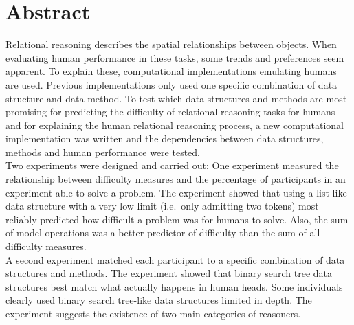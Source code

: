 \documentclass[hidelinks]{scrartcl}
\begin{document}


\section*{Abstract}
Relational reasoning describes the spatial relationships between objects. When evaluating human performance in these tasks, some trends and preferences seem apparent. To explain these, computational implementations emulating humans are used. Previous implementations only used one specific combination of data structure and data method. To test which data structures and methods are most promising for predicting the difficulty of relational reasoning tasks for humans and for explaining the human relational reasoning process, a new computational implementation was written and the dependencies between data structures, methods and human performance were tested. \\
Two experiments were designed and carried out: One experiment measured the relationship between difficulty measures and the percentage of participants in an experiment able to solve a problem. The experiment showed that using a list-like data structure with a very low limit (i.e.\ only admitting two \gls{token}s) most reliably predicted how difficult a problem was for humans to solve. Also, the sum of model operations was a better predictor of difficulty than the sum of all difficulty measures. \\
A second experiment matched each participant to a specific combination of data structures and methods. The experiment showed that binary search tree data structures best match what actually happens in human heads. Some individuals clearly used binary search tree-like data structures limited in depth. The experiment suggests the existence of two main categories of reasoners.

\newpage
\end{document}
